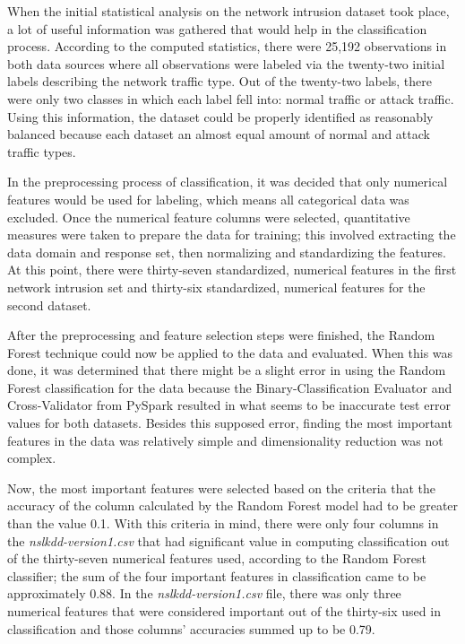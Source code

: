 \documentclass[a4paper,12pt]{IEEEtran}
\begin{document}
When the initial statistical analysis on the network intrusion dataset took place, a lot of useful information was gathered that would help in the classification process. According to the computed statistics, there were 25,192 observations in both data sources where all observations were labeled via the twenty-two initial labels describing the network traffic type. Out of the twenty-two labels, there were only two classes in which each label fell into: normal traffic or attack traffic. Using this information, the dataset could be properly identified as reasonably balanced because each dataset an almost equal amount of normal and attack traffic types.

In the preprocessing process of classification, it was decided that only numerical features would be used for labeling, which means all categorical data was excluded. Once the numerical feature columns were selected, quantitative measures were taken to prepare the data for training; this involved extracting the data domain and response set, then normalizing and standardizing the features. At this point, there were thirty-seven standardized, numerical features in the first network intrusion set and thirty-six standardized, numerical features for the second dataset.

After the preprocessing and feature selection steps were finished, the Random Forest technique could now be applied to the data and evaluated. When this was done, it was determined that there might be a slight error in using the Random Forest classification for the data because the Binary-Classification Evaluator and Cross-Validator from PySpark resulted in what seems to be inaccurate test error values for both datasets. Besides this supposed error, finding the most important features in the data was relatively simple and dimensionality reduction was not complex.

Now, the most important features were selected based on the criteria that the accuracy of the column calculated by the Random Forest model had to be greater than the value 0.1. With this criteria in mind, there were only four columns in the \textit{nslkdd-version1.csv} that had significant value in computing classification out of the thirty-seven numerical features used, according to the Random Forest classifier; the sum of the four important features in classification came to be approximately 0.88. In the \textit{nslkdd-version1.csv} file, there was only three numerical features that were considered important out of the thirty-six used in classification and those columns' accuracies summed up to be 0.79. 
\end{document}
